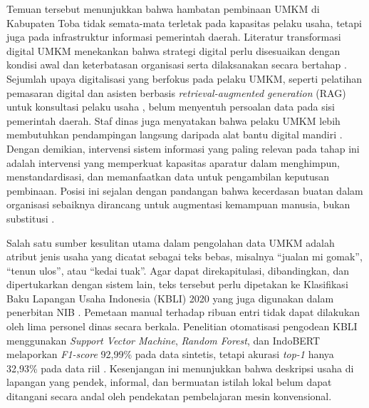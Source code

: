 \documentclass[12pt,a4paper]{report}
\begin{document}
Temuan tersebut menunjukkan bahwa hambatan pembinaan UMKM di Kabupaten Toba tidak semata-mata terletak pada kapasitas pelaku usaha, tetapi juga pada infrastruktur informasi pemerintah daerah. Literatur transformasi digital UMKM menekankan bahwa strategi digital perlu disesuaikan dengan kondisi awal dan keterbatasan organisasi serta dilaksanakan secara bertahap \cite{sagala2024sme,utomo2024digital}. Sejumlah upaya digitalisasi yang berfokus pada pelaku UMKM, seperti pelatihan pemasaran digital \cite{naibaho2025ulos,handayani2023digitalisasi} dan asisten berbasis \textit{retrieval-augmented generation} (RAG) untuk konsultasi pelaku usaha \cite{hardiyanti2026adaptive}, belum menyentuh persoalan data pada sisi pemerintah daerah. Staf dinas juga menyatakan bahwa pelaku UMKM lebih membutuhkan pendampingan langsung daripada alat bantu digital mandiri \cite{wawancarastaf2026}. Dengan demikian, intervensi sistem informasi yang paling relevan pada tahap ini adalah intervensi yang memperkuat kapasitas aparatur dalam menghimpun, menstandardisasi, dan memanfaatkan data untuk pengambilan keputusan pembinaan. Posisi ini sejalan dengan pandangan bahwa kecerdasan buatan dalam organisasi sebaiknya dirancang untuk augmentasi kemampuan manusia, bukan substitusi \cite{raisch2021automation,rajaram2024genai}.

Salah satu sumber kesulitan utama dalam pengolahan data UMKM adalah atribut jenis usaha yang dicatat sebagai teks bebas, misalnya ``jualan mi gomak'', ``tenun ulos'', atau ``kedai tuak''. Agar dapat direkapitulasi, dibandingkan, dan dipertukarkan dengan sistem lain, teks tersebut perlu dipetakan ke Klasifikasi Baku Lapangan Usaha Indonesia (KBLI) 2020 yang juga digunakan dalam penerbitan NIB \cite{bps2020kbli}. Pemetaan manual terhadap ribuan entri tidak dapat dilakukan oleh lima personel dinas secara berkala. Penelitian otomatisasi pengodean KBLI menggunakan \textit{Support Vector Machine}, \textit{Random Forest}, dan IndoBERT melaporkan \textit{F1-score} 92,99\% pada data sintetis, tetapi akurasi \textit{top-1} hanya 32,93\% pada data riil \cite{amnur2025kbli}. Kesenjangan ini menunjukkan bahwa deskripsi usaha di lapangan yang pendek, informal, dan bermuatan istilah lokal belum dapat ditangani secara andal oleh pendekatan pembelajaran mesin konvensional.
\end{document}
